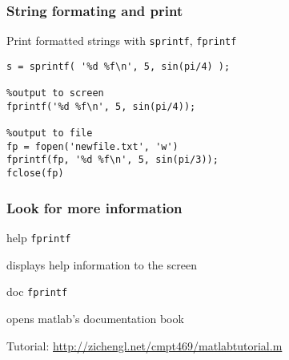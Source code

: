 \documentclass[11pt]{beamer}
\begin{document}
\begin{frame}[fragile]
  \frametitle{String formating and print}
  \Enlarge

  \begin{enumerate}
  \myitem  Print formatted strings with \texttt{sprintf}, \texttt{fprintf}
  \end{enumerate}
  \begin{Verbatim}
s = sprintf( '%d %f\n', 5, sin(pi/4) ); 

%output to screen
fprintf('%d %f\n', 5, sin(pi/4)); 

%output to file
fp = fopen('newfile.txt', 'w')
fprintf(fp, '%d %f\n', 5, sin(pi/3));
fclose(fp)
\end{Verbatim}
\end{frame}


\begin{frame}[fragile]
  \frametitle{Look for more information}
  \Enlarge

  \begin{enumerate}
    \myitem  help \texttt{fprintf}   
    	\begin{enumerate}
	\mysubitem displays help information to the screen
	\end{enumerate}
    \myitem  doc \texttt{fprintf}   
    	\begin{enumerate}
	\mysubitem opens matlab's documentation book
	\end{enumerate}\pause
  \end{enumerate}
  

  \vspace{5mm}
  Tutorial: {\small \url{http://zichengl.net/cmpt469/matlabtutorial.m}}
  
\end{frame} 
\end{document}

